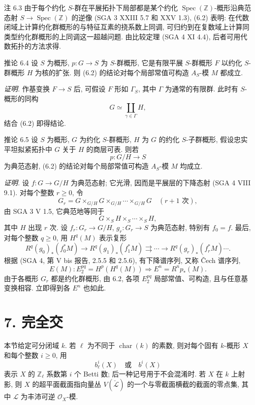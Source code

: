 \begin{statement}{注 6.3}
由于每个约化 $S$-群在平展拓扑下局部都是某个约化 $\operatorname{Spec}(\mathbb Z)$-概形沿典范态射 $S\to\operatorname{Spec}(\mathbb Z)$ 的逆像 (SGA 3 XXIII 5.7 和 XXV 1.3), (6.2) 表明: 在代数闭域上计算约化群概形的与特征互素的挠系数上同调, 可归约到在复数域上计算同类型约化群概形的上同调这一超越问题. 由比较定理 (SGA 4 XI 4.4), 后者可用代数拓扑的方法求得.
\end{statement}

\begin{statement}{推论 6.4}
设 $S$ 为概形, $p:G\to S$ 为 $S$-群概形, 它是有限平展 $S$-群概形 $F$ 以约化 $S$-群概形 $H$ 为核的扩张. 则 (6.2) 的结论对每个局部常值可构造 $A_S$-模 $M$ 都成立.
\end{statement}

\emph{证明.} 作基变换 $F\to S$ 后, 可假设 $F$ 形如 $\Gamma_S$, 其中 $\Gamma$ 为通常的有限群. 此时有 $S$-概形的同构
\[
G\simeq\coprod_{\gamma\in\Gamma}H,
\]
结合 (6.2) 即得结论.

\begin{statement}{推论 6.5}
设 $S$ 为概形, $G$ 为约化 $S$-群概形, $H$ 为 $G$ 的约化 $S$-子群概形, 假设忠实平坦拟紧拓扑中 $G$ 关于 $H$ 的商层可表. 则若
\[
p:G/H\to S
\]
为典范态射, (6.2) 的结论对每个局部常值可构造 $A_S$-模 $M$ 均成立.
\end{statement}

\emph{证明.} 设 $f:G\to G/H$ 为典范态射; 它光滑, 因而是平展层的下降态射 (SGA 4 VIII 9.1). 对每个整数 $r\ge0$, 令
\[
G_r=G\times_{G/H}G\times_{G/H}\cdots\times_{G/H}G
\quad(r+1\text{ 次}),
\]
由 SGA 3 V 1.5, 它典范地等同于
\[
G\times_S H\times_S\cdots\times_S H,
\]
其中 $H$ 出现 $r$ 次. 设 $f_r:G_r\to G/H$, $g_r:G_r\to S$ 为典范态射, 特别有 $f_0=f$. 最后, 对每个整数 $q\ge0$, 用 $H^q(M)$ 表示复形
\[
R^q(g_0)_*(f_0^*M)\to R^q(g_1)_*(f_1^*M)\rightrightarrows\cdots\to R^q(g_r)_*(f_r^*M)\cdots .
\]
根据 (SGA 4, 第 V bis 报告, 2.5.5 和 2.5.6), 有下降谱序列, 又称 Čech 谱序列,
\[
E(M):E_2^{pq}=H^p(H^q(M))\Rightarrow E^n=R^np_*(M).
\]
由于各概形 $G_r$ 都是约化群概形, 由 6.2, 各项 $E_2^{pq}$ 局部常值、可构造, 且与任意基变换相容. 立即得到各 $E^n$ 也如此.

\section*{7. 完全交}

本节给定可分闭域 $k$. 若 $\ell$ 为不同于 $\operatorname{char}(k)$ 的素数, 则对每个固有 $k$-概形 $X$ 和每个整数 $i\ge0$, 用
\[
b_\ell^i(X)\quad\text{或}\quad b^i(X)
\]
表示 $X$ 的 $\mathbb Z_\ell$ 系数第 $i$ 个 Betti 数; 后一种记号用于不会混淆时. 若 $X$ 在 $k$ 上射影, 则 $X$ 的超平面截面指向量丛 $V(\check{\mathcal L})$ 的一个与零截面横截的截面的零点集, 其中 $\mathcal L$ 为丰沛可逆 $\mathcal O_X$-模.

